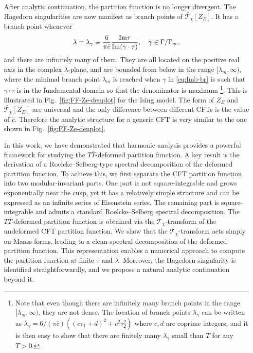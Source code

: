 \documentclass[aps,twocolumn,prl,showpacs,amsmath,amssymb,10pt]{revtex4-2}
\def\tc{\bar{c}}
\begin{document}
\vspace{0.3cm}
After analytic continuation, the partition function is no longer divergent. The Hagedorn singularities are now manifest as branch points of $\widetilde{\mathcal{T}_{\chi}}[Z_E]$. It has a branch point whenever
\begin{equation}\label{eq:lmb-br}
    \lambda = \lambda_\gamma \equiv \frac{6}{\pi \tc}\frac{{\rm Im}\tau}{{\rm Im}(\gamma\cdot\tau)},\quad \gamma \in \Gamma/\Gamma_\infty,
\end{equation}
and there are infinitely many of them. They are all located on the positive real axis in the complex $\lambda$-plane, and are bounded from below in the range $[\lambda_m,\infty)$, where the minimal branch point $\lambda_m$ is reached when $\gamma$ in \eqref{eq:lmb-br} is such that $\gamma\cdot \tau$ is in the fundamental domain so that the denominator is maximum \footnote{Note that even though there are infinitely many branch points in the range  $[\lambda_m,\infty)$, they are not dense. The location of branch points $\lambda_\gamma$ can be written as
$\lambda_\gamma = 6/(\pi\tc)((c\tau_1+d)^2+c^2\tau_2^2)$ where $c,d$ are coprime integers, and it is then easy to show that
there are finitely many $\lambda_\gamma$ small than $T$ for any $T > 0$.}. This is illustrated in Fig.~\ref{fig:FF-Ze-denplot} for the Ising model. The form of $Z_E$ and $\widetilde{\mathcal{T}_{\chi}}[Z_E]$ are universal and the only difference between different CFTs is the value of $\bar{c}$. Therefore the analytic structure for a generic CFT is very similar to the one shown in Fig.~\ref{fig:FF-Ze-denplot}.

\vspace{0.5cm}




In this work, we have demonstrated that harmonic analysis provides a powerful framework for studying the $T\bar{T}$-deformed partition function. A key result is the derivation of a Roelcke–Selberg-type spectral decomposition of the deformed partition function. To achieve this, we first separate the CFT partition function into two modular-invariant parts. One part is not square-integrable and grows exponentially near the cusp, yet it has a relatively simple structure and can be expressed as an infinite series of Eisenstein series. The remaining part is square-integrable and admits a standard Roelcke–Selberg spectral decomposition. The $T\bar{T}$-deformed partition function is obtained via the $\mathcal{T}_{\chi}$-transform of the undeformed CFT partition function. We show that the $\mathcal{T}_{\chi}$-transform acts simply on Maass forms, leading to a clean spectral decomposition of the deformed partition function. This representation enables a numerical approach to compute the partition function at finite $\tau$ and $\lambda$. Moreover, the Hagedorn singularity is identified straightforwardly, and we propose a natural analytic continuation beyond it.
\end{document}
